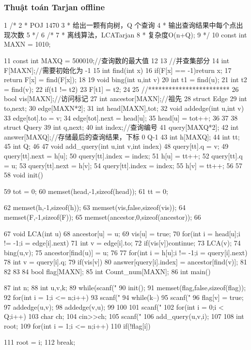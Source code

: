\documentclass[11pt]{article}
\begin{document}
\subsubsection{Thuật toán Tarjan offline}

\begin{Code}
 1 /*
 2 * POJ 1470
 3 * 给出一颗有向树，Q 个查询
 4 * 输出查询结果中每个点出现次数
 5 */
 6 /*
 7 * 离线算法，LCATarjan
 8 * 复杂度O(n+Q);
 9 */
10 const int MAXN = 1010;


11   const int MAXQ = 500010;//查询数的最大值
12
13   //并查集部分
14   int F[MAXN];//需要初始化为 -1
15   int find(int x){
16       if(F[x] == -1)return x;
17       return F[x] = find(F[x]);
18   }
19   void bing(int u,int v){
20       int t1 = find(u);
21       int t2 = find(v);
22       if(t1 != t2)
23           F[t1] = t2;
24   }
25   //************************
26   bool vis[MAXN];//访问标记
27   int ancestor[MAXN];//祖先
28   struct Edge{
29       int to,next;
30   }edge[MAXN*2];
31   int head[MAXN],tot;
32   void addedge(int u,int v){
33       edge[tot].to = v;
34       edge[tot].next = head[u];
35       head[u] = tot++;
36   }
37
38   struct Query{
39       int q,next;
40       int index;//查询编号
41   }query[MAXQ*2];
42   int answer[MAXQ];//存储最后的查询结果，下标 0 Q-1
43   int h[MAXQ];
44   int tt;
45   int Q;
46
47   void add_query(int u,int v,int index){
48       query[tt].q = v;
49       query[tt].next = h[u];
50       query[tt].index = index;
51       h[u] = tt++;
52       query[tt].q = u;
53       query[tt].next = h[v];
54       query[tt].index = index;
55       h[v] = tt++;
56   }
57
58   void init(){
59       tot = 0;
60       memset(head,-1,sizeof(head));
61       tt = 0;


 62       memset(h,-1,sizeof(h));
 63       memset(vis,false,sizeof(vis));
 64       memset(F,-1,sizeof(F));
 65       memset(ancestor,0,sizeof(ancestor));
 66   }
 67   void LCA(int u){
 68       ancestor[u] = u;
 69       vis[u] = true;
 70       for(int i = head[u];i != -1;i = edge[i].next){
 71           int v = edge[i].to;
 72           if(vis[v])continue;
 73           LCA(v);
 74           bing(u,v);
 75           ancestor[find(u)] = u;
 76       }
 77       for(int i = h[u];i != -1;i = query[i].next){
 78           int v = query[i].q;
 79           if(vis[v]){
 80               answer[query[i].index] = ancestor[find(v)];
 81           }
 82       }
 83   }
 84   bool flag[MAXN];
 85   int Count_num[MAXN];
 86   int main(){
 87       int n;
 88       int u,v,k;
 89       while(scanf("%
 90           init();
 91           memset(flag,false,sizeof(flag));
 92           for(int i = 1;i <= n;i++){
 93               scanf("%
 94               while(k--){
 95                    scanf("%
 96                    flag[v] = true;
 97                    addedge(u,v);
 98                    addedge(v,u);
 99               }
100           }
101           scanf("%
102           for(int i = 0;i < Q;i++){
103               char ch;
104               cin>>ch;
105               scanf("%
106               add_query(u,v,i);
107           }
108           int root;
109           for(int i = 1;i <= n;i++)
110               if(!flag[i]){
111                    root = i;
112                    break;


}}
\end{Code}
\end{document}
